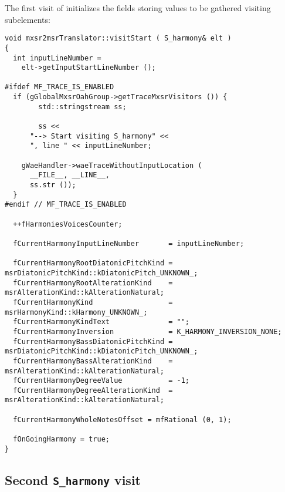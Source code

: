 The first visit of  initializes the fields storing values to be gathered visiting subelements:
\begin{lstlisting}[language=CPlusPlus]
void mxsr2msrTranslator::visitStart ( S_harmony& elt )
{
  int inputLineNumber =
    elt->getInputStartLineNumber ();

#ifdef MF_TRACE_IS_ENABLED
  if (gGlobalMxsrOahGroup->getTraceMxsrVisitors ()) {
		std::stringstream ss;

		ss <<
      "--> Start visiting S_harmony" <<
      ", line " << inputLineNumber;

    gWaeHandler->waeTraceWithoutInputLocation (
      __FILE__, __LINE__,
      ss.str ());
  }
#endif // MF_TRACE_IS_ENABLED

  ++fHarmoniesVoicesCounter;

  fCurrentHarmonyInputLineNumber       = inputLineNumber;

  fCurrentHarmonyRootDiatonicPitchKind = msrDiatonicPitchKind::kDiatonicPitch_UNKNOWN_;
  fCurrentHarmonyRootAlterationKind    = msrAlterationKind::kAlterationNatural;
  fCurrentHarmonyKind                  = msrHarmonyKind::kHarmony_UNKNOWN_;
  fCurrentHarmonyKindText              = "";
  fCurrentHarmonyInversion             = K_HARMONY_INVERSION_NONE;
  fCurrentHarmonyBassDiatonicPitchKind = msrDiatonicPitchKind::kDiatonicPitch_UNKNOWN_;
  fCurrentHarmonyBassAlterationKind    = msrAlterationKind::kAlterationNatural;
  fCurrentHarmonyDegreeValue           = -1;
  fCurrentHarmonyDegreeAlterationKind  = msrAlterationKind::kAlterationNatural;

  fCurrentHarmonyWholeNotesOffset = mfRational (0, 1);

  fOnGoingHarmony = true;
}
\end{lstlisting}


\subsection{Second {\tt S_harmony} visit}

